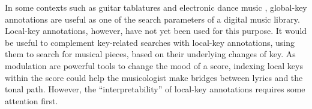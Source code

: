 
In some contexts such as guitar tablatures
\cite{ultimateguitar} and electronic dance music
\cite{beatport}, global-key annotations are useful as one of
the search parameters of a digital music library. Local-key
annotations, however, have not yet been used for this
purpose. It would be useful to complement key-related
searches with local-key annotations, using them to search
for musical pieces, based on their underlying changes of
key. As modulation are powerful tools to change the mood of
a score, indexing local keys within the score could help the
musicologist make bridges between lyrics and the tonal path.
However, the ``interpretability'' of local-key annotations
requires some attention first.
